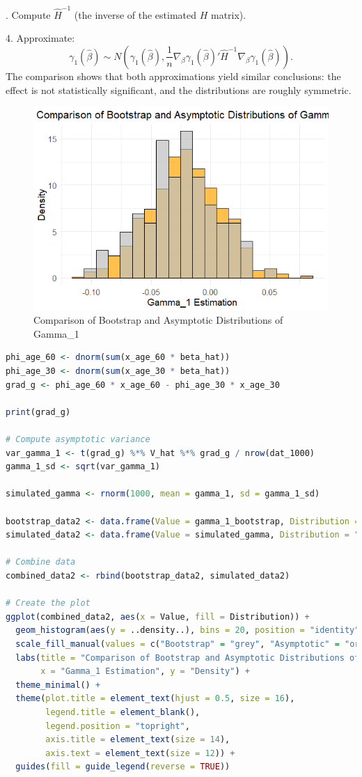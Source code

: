 \documentclass[a4paper,12pt]{article} %
\theoremstyle{nonitalic}
\newenvironment{solution}[1]
  {\renewcommand\theinnercustomsol{#1}\innercustomsol}
  {\endinnercustomsol}
\newcounter{solutionctr}[section]
\renewcommand{\thesolutionctr}{(\alph{solutionctr})}
\newenvironment{autosolution}
  {\stepcounter{solutionctr}\begin{solution}{\thesolutionctr}}
  {\end{solution}}
\begin{document}
\begin{autosolution}
    3. Compute $\hat{H}^{-1}$ (the inverse of the estimated $H$ matrix).

    4. Approximate:
    \[
    \gamma_1(\hat{\beta}) \sim N\left(\gamma_1(\hat{\beta}), \frac{1}{n}\nabla_\beta \gamma_1(\hat{\beta})' \hat{H}^{-1} \nabla_\beta \gamma_1(\hat{\beta})\right).
    \]
    The comparison shows that both approximations yield similar conclusions: the effect is not statistically significant, and the distributions are roughly symmetric.
    \begin{figure}[!htbp]
        \centering
        \includegraphics[width=0.5\linewidth]{i.png}
        \caption{Comparison of Bootstrap and Asymptotic Distributions of Gamma\_1}
        \label{fig:i}
    \end{figure}

    \begin{lstlisting}[language=R]
phi_age_60 <- dnorm(sum(x_age_60 * beta_hat))
phi_age_30 <- dnorm(sum(x_age_30 * beta_hat))
grad_g <- phi_age_60 * x_age_60 - phi_age_30 * x_age_30

print(grad_g)

# Compute asymptotic variance
var_gamma_1 <- t(grad_g) %*% V_hat %*% grad_g / nrow(dat_1000)
gamma_1_sd <- sqrt(var_gamma_1)

simulated_gamma <- rnorm(1000, mean = gamma_1, sd = gamma_1_sd)

bootstrap_data2 <- data.frame(Value = gamma_1_bootstrap, Distribution = "Bootstrap")
simulated_data2 <- data.frame(Value = simulated_gamma, Distribution = "Asymptotic")

# Combine data
combined_data2 <- rbind(bootstrap_data2, simulated_data2)

# Create the plot
ggplot(combined_data2, aes(x = Value, fill = Distribution)) +
  geom_histogram(aes(y = ..density..), bins = 20, position = "identity", alpha = 0.7, color = "black") +
  scale_fill_manual(values = c("Bootstrap" = "grey", "Asymptotic" = "orange")) +
  labs(title = "Comparison of Bootstrap and Asymptotic Distributions of Gamma_1",
       x = "Gamma_1 Estimation", y = "Density") +
  theme_minimal() +
  theme(plot.title = element_text(hjust = 0.5, size = 16),
        legend.title = element_blank(),
        legend.position = "topright",
        axis.title = element_text(size = 14),
        axis.text = element_text(size = 12)) +
  guides(fill = guide_legend(reverse = TRUE))        
    \end{lstlisting}
\end{autosolution}
\end{document}
